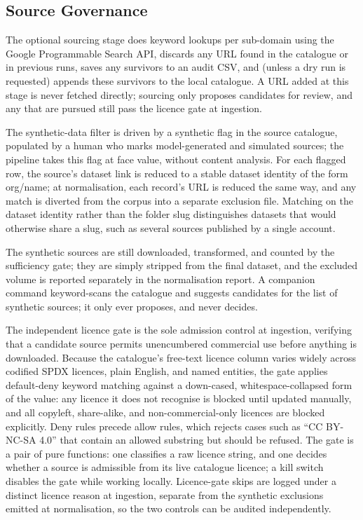\documentclass[conference]{IEEEtran}
\begin{document}
\subsection{Source Governance}

The optional sourcing stage does keyword lookups per sub-domain using the Google Programmable Search API, discards any URL found in the catalogue or in previous runs, saves any survivors to an audit CSV, and (unless a dry run is requested) appends these survivors to the local catalogue. A URL added at this stage is never fetched directly; sourcing only proposes candidates for review, and any that are pursued still pass the licence gate at ingestion.

The synthetic-data filter is driven by a synthetic flag in the source catalogue, populated by a human who marks model-generated and simulated sources; the pipeline takes this flag at face value, without content analysis. For each flagged row, the source's dataset link is reduced to a stable dataset identity of the form org/name; at normalisation, each record's URL is reduced the same way, and any match is diverted from the corpus into a separate exclusion file. Matching on the dataset identity rather than the folder slug distinguishes datasets that would otherwise share a slug, such as several sources published by a single account.

The synthetic sources are still downloaded, transformed, and counted by the sufficiency gate; they are simply stripped from the final dataset, and the excluded volume is reported separately in the normalisation report. A companion command keyword-scans the catalogue and suggests candidates for the list of synthetic sources; it only ever proposes, and never decides.

The independent licence gate is the sole admission control at ingestion, verifying that a candidate source permits unencumbered commercial use before anything is downloaded. Because the catalogue's free-text licence column varies widely across codified SPDX licences, plain English, and named entities, the gate applies default-deny keyword matching against a down-cased, whitespace-collapsed form of the value: any licence it does not recognise is blocked until updated manually, and all copyleft, share-alike, and non-commercial-only licences are blocked explicitly. Deny rules precede allow rules, which rejects cases such as ``CC BY-NC-SA 4.0'' that contain an allowed substring but should be refused. The gate is a pair of pure functions: one classifies a raw licence string, and one decides whether a source is admissible from its live catalogue licence; a kill switch disables the gate while working locally. Licence-gate skips are logged under a distinct licence reason at ingestion, separate from the synthetic exclusions emitted at normalisation, so the two controls can be audited independently.
\end{document}
